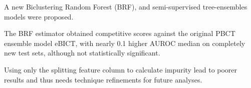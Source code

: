 \documentclass[conference]{IEEEtran}
\begin{document}
A new Biclustering Random Forest (BRF), and semi-supervised tree-ensembles models were proposed.

The BRF estimator obtained competitive scores against the original PBCT ensemble model eBICT, with nearly 0.1 higher AUROC median on completely new test sets, although not statistically significant.

Using only the splitting feature column to calculate impurity lead to poorer results and thus needs technique refinements for future analyses.

% 
% 
% 
% 


\end{document}
